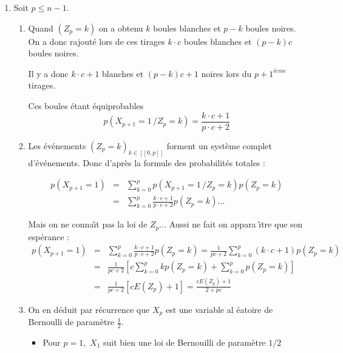\begin{correction}
\begin{enumerate}
\item Soit $p\leqslant n-1$.

\begin{enumerate}
\item Quand $\left( Z_{p}=k\right) $ on a obtenu $k$ boules blanches et $p-k 
$ boules noires. On a donc rajout\'{e} lors de ces tirages $k\cdot c$ boules
blanches et $\left( p-k\right) c$ boules noires.

Il y a donc $k\cdot c+1$ blanches et $\left( p-k\right) c+1$ noires lors du $%
p+1^{i\grave{e}me}$ tirages$.$

Ces boules \'{e}tant \'{e}quiprobables 
\begin{equation*}
p(X_{p+1}=1\,/Z_{p}=k)=\frac{k\cdot c+1}{p\cdot c+2}
\end{equation*}

\item Les \'{e}v\'{e}nements $\left( Z_{p}=k\right) _{k\in \left[ \left[ 0,p%
\right] \right] }$ forment un syst\`{e}me complet d'\'{e}v\'{e}nements. Donc
d'apr\`{e}s la formule des probabilit\'{e}s totales :

\begin{eqnarray*}
p\left( X_{p+1}=1\right) &=&\sum_{k=0}^{p}p(X_{p+1}=1\,/Z_{p}=k)p\left(
Z_{p}=k\right) \\
&=&\sum_{k=0}^{p}\frac{k\cdot c+1}{p\cdot c+2}p\left( Z_{p}=k\right) \dots
\end{eqnarray*}

Mais on ne conna\^{\i}t pas la loi de $Z_{p}\dots $ Aussi ne fait on appara%
\^{\i}tre que son esp\'{e}rance : 
\begin{eqnarray*}
p\left( X_{p+1}=1\right) &=&\sum_{k=0}^{p}\frac{k\cdot c+1}{p\cdot c+2}%
p\left( Z_{p}=k\right) =\frac{1}{pc+2}\sum_{k=0}^{p}\left( k\cdot c+1\right)
p\left( Z_{p}=k\right) \\
&=&\frac{1}{pc+2}\left[ c\sum_{k=0}^{p}kp\left( Z_{p}=k\right)
+\sum_{k=0}^{p}p\left( Z_{p}=k\right) \right] \\
&=&\frac{1}{pc+2}\left[ cE\left( Z_{p}\right) +1\right] =\frac{cE\left(
Z_{p}\right) +1}{2+pc}
\end{eqnarray*}

\item On en d\'{e}duit par r\'{e}currence que $X_{p}$ est une variable al%
\'{e}atoire de Bernoulli de param\`{e}tre $\displaystyle \frac{1}{2}$.

\begin{itemize}
\item Pour $p=1,$ $X_{1}$ suit bien une loi de Bernouilli de param\`{e}tre $%
1/2$


\end{itemize}
\end{enumerate}
\end{enumerate}
\end{correction}
